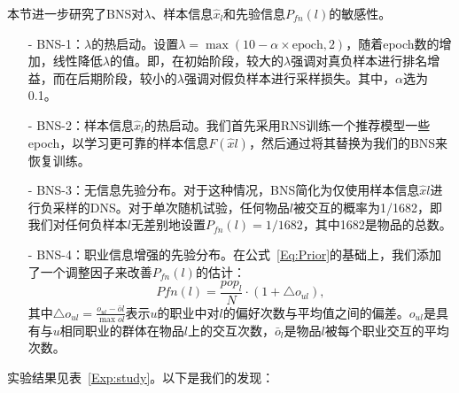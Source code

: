 本节进一步研究了\textsf{BNS}对$\lambda$、样本信息$\hat{x}_l$和先验信息$P_{fn}(l)$的敏感性。
\begin{itemize}
	\item[-]\textsf{BNS}-1：$\lambda$的热启动。设置$\lambda = \max(10-\alpha \times \text{epoch}, 2)$，随着epoch数的增加，线性降低$\lambda$的值。即，在初始阶段，较大的$\lambda$强调对真负样本进行排名增益，而在后期阶段，较小的$\lambda$强调对假负样本进行采样损失。其中，$\alpha$选为0.1。
	\item[-]\textsf{BNS}-2：样本信息$\hat{x}_l$的热启动。我们首先采用\textsf{RNS}训练一个推荐模型一些epoch，以学习更可靠的样本信息$F(\hat{x}l)$，然后通过将其替换为我们的\textsf{BNS}来恢复训练。
	\item[-]\textsf{BNS}-3：无信息先验分布。对于这种情况，\textsf{BNS}简化为仅使用样本信息$\hat{x}l$进行负采样的\textsf{DNS}。对于单次随机试验，任何物品$l$被交互的概率为1/1682，即我们对任何负样本$l$无差别地设置$P_{fn}(l) = 1/1682$，其中1682是物品的总数。
	\item[-]\textsf{BNS}-4：职业信息增强的先验分布。在公式~\eqref{Eq:Prior}的基础上，我们添加了一个调整因子来改善$P_{fn}(l)$的估计：
	\[P{fn}(l) = \frac{pop_l}{N} \cdot (1 + \triangle o_{ul}),\]
	其中$\triangle o_{ul} = \frac{o_{ul} - \bar{o}l}{\max{o}{l}}$表示$u$的职业中对$l$的偏好次数与平均值之间的偏差。$o_{ul}$是具有与$u$相同职业的群体在物品$l$上的交互次数，$\bar{o}_l$是物品$l$被每个职业交互的平均次数。
\end{itemize}
实验结果见表~\ref{Exp:study}。以下是我们的发现：

